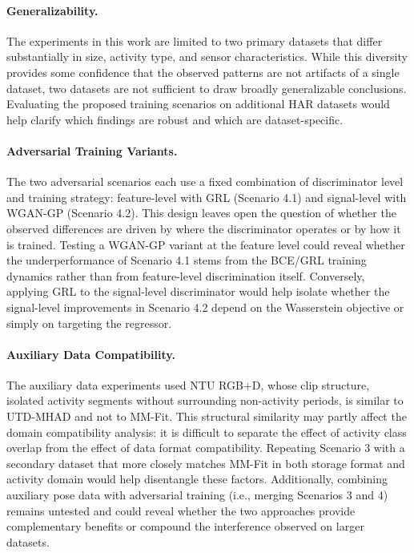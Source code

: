 \paragraph{Generalizability.}
The experiments in this work are limited to two primary datasets that differ substantially in size, activity type, and sensor characteristics. While this diversity provides some confidence that the observed patterns are not artifacts of a single dataset, two datasets are not sufficient to draw broadly generalizable conclusions. Evaluating the proposed training scenarios on additional HAR datasets would help clarify which findings are robust and which are dataset-specific.

\paragraph{Adversarial Training Variants.}
The two adversarial scenarios each use a fixed combination of discriminator level and training strategy: feature-level with GRL\cite{ganin2016domain} (Scenario 4.1) and signal-level with WGAN-GP\cite{arjovsky2017wasserstein,gulrajani2017improved} (Scenario 4.2). This design leaves open the question of whether the observed differences are driven by where the discriminator operates or by how it is trained. Testing a WGAN-GP variant at the feature level could reveal whether the underperformance of Scenario 4.1 stems from the BCE/GRL training dynamics rather than from feature-level discrimination itself. Conversely, applying GRL to the signal-level discriminator would help isolate whether the signal-level improvements in Scenario 4.2 depend on the Wasserstein objective or simply on targeting the regressor.

\paragraph{Auxiliary Data Compatibility.}
The auxiliary data experiments used NTU RGB+D\cite{shahroudy2016ntu}, whose clip structure, isolated activity segments without surrounding non-activity periods, is similar to UTD-MHAD and not to MM-Fit. This structural similarity may partly affect the domain compatibility analysis: it is difficult to separate the effect of activity class overlap from the effect of data format compatibility. Repeating Scenario 3 with a secondary dataset that more closely matches MM-Fit in both storage format and activity domain would help disentangle these factors. Additionally, combining auxiliary pose data with adversarial training (i.e., merging Scenarios 3 and 4) remains untested and could reveal whether the two approaches provide complementary benefits or compound the interference observed on larger datasets.
